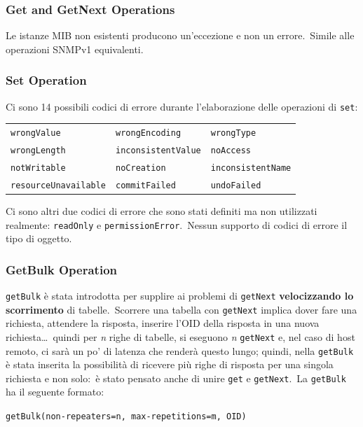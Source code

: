 \subsubsection{Get and GetNext Operations}

Le istanze MIB non esistenti producono un'eccezione e non un errore.\
Simile alle operazioni SNMPv1 equivalenti.

\subsubsection{Set Operation}

Ci sono 14 possibili codici di errore durante l'elaborazione delle operazioni di \texttt{set}:
\begin{table}[H]
    \centering
    \begin{tabular}{l l l}
        \texttt{wrongValue}          & \texttt{wrongEncoding}     & \texttt{wrongType}        \\
        \texttt{wrongLength}         & \texttt{inconsistentValue} & \texttt{noAccess}         \\
        \texttt{notWritable}         & \texttt{noCreation}        & \texttt{inconsistentName} \\
        \texttt{resourceUnavailable} & \texttt{commitFailed}      & \texttt{undoFailed}       \\
    \end{tabular}
\end{table}

\noindent Ci sono altri due codici di errore che sono stati definiti ma non utilizzati realmente: \texttt{readOnly} e \texttt{permissionError}.\
Nessun supporto di codici di errore il tipo di oggetto.\

\subsubsection{GetBulk Operation}

\texttt{getBulk} è stata introdotta per supplire ai problemi di \texttt{getNext} \textbf{velocizzando lo scorrimento} di tabelle.\
Scorrere una tabella con \texttt{getNext} implica dover fare una richiesta, attendere la risposta, inserire l'OID della risposta in una nuova richiesta\dots\ quindi per \textit{n} righe di tabelle, si eseguono \textit{n} \texttt{getNext} e, nel caso di host remoto, ci sarà un po' di latenza che renderà questo lungo; quindi, nella \texttt{getBulk} è stata inserita la possibilità di ricevere più righe di risposta per una singola richiesta e non solo:\ è stato pensato anche di unire \texttt{get} e \texttt{getNext}.\
La \texttt{getBulk} ha il seguente formato:
\begin{center}
    \verb|getBulk(non-repeaters=n, max-repetitions=m, OID)|
\end{center}

